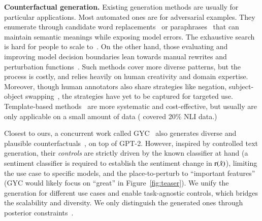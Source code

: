 \noindent\textbf{Counterfactual generation.}
Existing generation methods are usually for particular applications.
Most automated ones are for adversarial examples. 
They enumerate through candidate word replacements~\cite{alzantot2018generating, garg2020bae, alzantot2018generating, andreas2019good} or paraphrases~\cite{iyyer2018adversarial, malandrakis-etal-2019-controlled} that can maintain semantic meanings while exposing model errors.
The exhaustive search is hard for people to scale to~\cite{ribeiro2018sear}.
On the other hand, those evaluating and improving model decision boundaries lean towards manual rewrites and perturbation functions~\cite{checklist:acl20}.
Such methods cover more diverse patterns, but the process is costly, and relies heavily on human creativity and domain expertise.
Moreover, though human annotators also share strategies like negation, subject-object swapping~\cite{kaushik2019learning, gardner2020contrast}, the strategies have yet to be captured for targeted use.
Template-based methods~\cite{mccoy2019right, nie2019analyzing} are more systematic and cost-effective, but usually are only applicable on a small amount of data (\eg \citet{li2020linguistically} covered 20\% NLI data.)

Closest to ours, a concurrent work called GYC~\cite{madaan2020generate} also generates diverse and plausible counterfactuals~\cite{Dathathri2020Plug}, on top of GPT-2.
However, inspired by controlled text generation, their \emph{controls} are strictly driven by the known classifier at hand (\eg a sentiment classifier is required to establish the sentiment change in $\operatorname*{r}(\hat{x})$), limiting the use case to specific models, and the place-to-perturb to ``important features'' (\eg GYC would likely focus on ``great'' in Figure~\ref{fig:teaser}).
We unify the generation for different use cases and enable task-agnostic controls, which bridges the scalability and diversity.
We only distinguish the generated ones through posterior constraints~\cite{morris2020textattack, alzantot-etal-2018-generating}.







